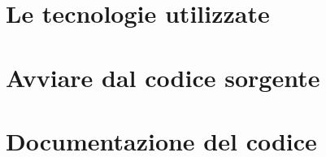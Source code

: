 \chapter{Le tecnologie utilizzate}


\chapter{Avviare dal codice sorgente}


\chapter{Documentazione del codice}
